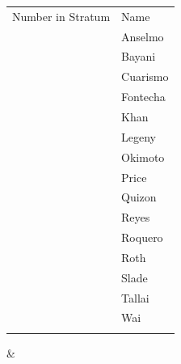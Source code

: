 \documentclass[letterpaper,10pt,english]{jupyterBook}
\begin{document}
\begin{savenotes}
\begin{tabular}[t]{*{3}{}}
\begin{savenotes}\sphinxattablestart
\sphinxthistablewithglobalstyle
\centering
\begin{tabulary}{\linewidth}[t]{TT}
\sphinxtoprule
\sphinxstyletheadfamily 
\sphinxAtStartPar
Number in Stratum
&\sphinxstyletheadfamily 
\sphinxAtStartPar
Name
\\
\sphinxmidrule
\sphinxtableatstartofbodyhook
{}
&
\sphinxAtStartPar
Anselmo
\\
\sphinxhline
{}
&
\sphinxAtStartPar
Bayani
\\
\sphinxhline
{}
&
\sphinxAtStartPar
Cuarismo
\\
\sphinxhline
{}
&
\sphinxAtStartPar
Fontecha
\\
\sphinxhline
{}
&
\sphinxAtStartPar
Khan
\\
\sphinxhline
{}
&
\sphinxAtStartPar
Legeny
\\
\sphinxhline
{}
&
\sphinxAtStartPar
Okimoto
\\
\sphinxhline
{}
&
\sphinxAtStartPar
Price
\\
\sphinxhline
{}
&
\sphinxAtStartPar
Quizon
\\
\sphinxhline
{}
&
\sphinxAtStartPar
Reyes
\\
\sphinxhline
{}
&
\sphinxAtStartPar
Roquero
\\
\sphinxhline
{}
&
\sphinxAtStartPar
Roth
\\
\sphinxhline
{}
&
\sphinxAtStartPar
Slade
\\
\sphinxhline
{}
&
\sphinxAtStartPar
Tallai
\\
\sphinxhline
{}
&
\sphinxAtStartPar
Wai
\\
\sphinxbottomrule
\end{tabulary}
\sphinxtableafterendhook\par
\sphinxattableend\end{savenotes}
&


\end{tabular}
\end{savenotes}
\end{document}
